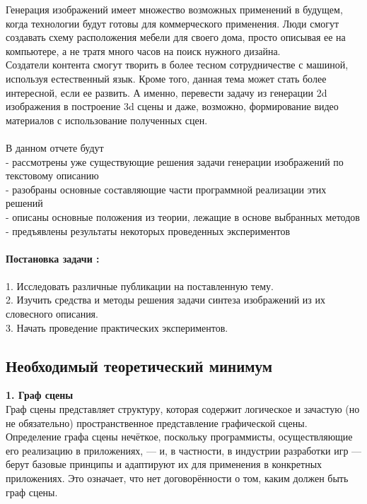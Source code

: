 \documentclass{article}
\begin{document}
    Генерация изображений имеет множество возможных применений в
    будущем, когда технологии будут готовы для коммерческого применения. 
    Люди смогут создавать схему расположения мебели для своего дома, просто описывая ее на компьютере, а не тратя много часов на поиск нужного дизайна.\\ 
    Создатели контента смогут творить в более тесном сотрудничестве с машиной, используя естественный язык.
    Кроме того, данная тема может стать более интересной, если ее развить. А именно, перевести задачу из генерации 2d изображения в построение 3d сцены и даже, возможно, формирование видео материалов с использование полученных сцен.\\ \\
    В данном отчете будут \\
    - рассмотрены уже существующие решения задачи генерации изображений по текстовому описанию\\
    - разобраны основные составляющие части программной реализации этих решений\\
    - описаны основные положения из теории, лежащие в основе выбранных методов\\
    - предъявлены результаты некоторых проведенных экспериментов\\ \\
    \large \textbf{Постановка задачи :} \\ \\
      \large 1. Исследовать различные публикации на поставленную тему.\\
             2. Изучить средства и методы решения задачи синтеза изображений из их словесного описания.\\
             3. Начать проведение практических экспериментов.\\
    \newpage
    \begin{center} 
    \section{Необходимый теоретический минимум}
    \end{center} 
      \large \textbf{1. Граф сцены}\\
      Граф сцены представляет структуру, которая содержит логическое и зачастую (но не обязательно) пространственное представление графической сцены. Определение графа сцены нечёткое, поскольку программисты, осуществляющие его реализацию в приложениях, — и, в частности, в индустрии разработки игр — берут базовые принципы и адаптируют их для применения в конкретных приложениях. Это означает, что нет договорённости о том, каким должен быть граф сцены.
\end{document}
